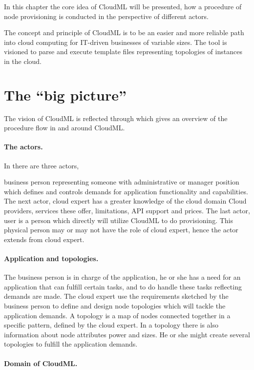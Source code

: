 

In this chapter the core idea of CloudML will be presented,
how a procedure of node provisioning is conducted in the perspective of different actors.

The concept and principle of CloudML is to be an easier and more reliable
path into cloud computing for IT-driven businesses of variable sizes.
The tool is visioned to parse and execute template files representing topologies
of instances in the cloud. 

\section{The ``big picture''}

The vision of CloudML is reflected through  which gives
an overview of the procedure flow in and around CloudML.

\paragraph{The actors.}

In  there are three actors,
\begin{ii}
  \iitem business person representing someone with administrative or manager position which
    defines and controls demands for application functionality and capabilities.
    The next actor,
  \iitem cloud expert has a greater knowledge of the cloud domain \eg Cloud providers,
    services these offer, limitations, API support and prices.
    The last actor,
  \iitem user is a person which directly will utilize CloudML to do provisioning.
    This physical person may or may not have the role of cloud expert, hence 
    the actor extends from cloud expert.
\end{ii}

\paragraph{Application and topologies.}

The business person is in charge of the application, he or she has a need
for an application that can fulfill certain tasks, and to do handle these 
tasks reflecting demands are made.
The cloud expert use the requirements sketched by the business person to 
define and design node topologies which will tackle the application demands.
A topology is a map of nodes connected together in a specific pattern, 
defined by the cloud expert.
In a topology there is also information about node attributes 
\eg {} power and  sizes.
He or she might create several topologies to fulfill the application demands.

\paragraph{Domain of CloudML.}


